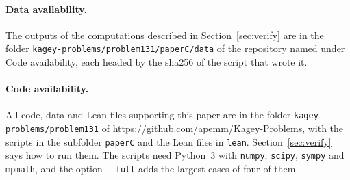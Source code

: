 \documentclass[11pt]{article}
\theoremstyle{definition}
\theoremstyle{remark}
\begin{document}
\paragraph{Data availability.} The outputs of the computations described in
Section~\ref{sec:verify} are in the folder
\nolinkurl{kagey-problems/problem131/paperC/data} of the repository named under
Code availability, each headed by the sha256 of the script that wrote it.

\paragraph{Code availability.} All code, data and Lean files supporting this
paper are in the folder \nolinkurl{kagey-problems/problem131} of
\url{https://github.com/apemm/Kagey-Problems}, with the scripts in the
subfolder \nolinkurl{paperC} and the Lean files in \nolinkurl{lean}.
Section~\ref{sec:verify} says how to run them. The scripts need Python~3 with
\texttt{numpy}, \texttt{scipy}, \texttt{sympy} and \texttt{mpmath}, and the
option \texttt{-{}-full} adds the largest cases of four of them.

\appendix






{\small}
\end{document}
